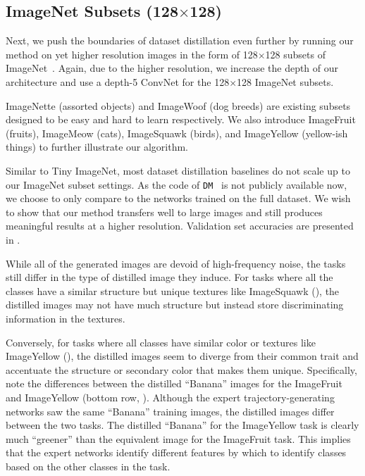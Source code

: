 \documentclass[main.tex]{subfiles}
\begin{document}
\subsection{ImageNet Subsets (128$\times$128)}

Next, we push the boundaries of dataset distillation even further by running our method on yet higher resolution images in the form of 128$\times$128 subsets of ImageNet~\cite{deng2009imagenet}. Again, due to the higher resolution, we increase the depth of our architecture and use a depth-5 ConvNet for the 128$\times$128 ImageNet subsets.


ImageNette (assorted objects) and ImageWoof (dog breeds) are existing subsets~\cite{imagenette} designed to be easy and hard to learn respectively. We also introduce ImageFruit (fruits), ImageMeow (cats), ImageSquawk (birds), and ImageYellow (yellow-ish things) to further illustrate our algorithm. %

Similar to Tiny ImageNet, most dataset distillation baselines do not scale up to our ImageNet subset settings.
As the code of \texttt{DM}~\cite{dm} is not publicly available now, we choose to only compare to the networks trained on the full dataset. We wish to show that our method transfers well to large images and still produces meaningful results at a higher resolution. Validation set accuracies are presented in .

While all of the generated images are devoid of high-frequency noise, the tasks still differ in the type of distilled image they induce. For tasks where all the classes have a similar structure but unique textures like ImageSquawk (), the distilled images may not have much structure but instead store discriminating information in the textures.

Conversely, for tasks where all classes have similar color or textures like ImageYellow (), the distilled images seem to diverge from their common trait and accentuate the structure or secondary color that makes them unique. Specifically, note the differences between the distilled ``Banana'' images for the ImageFruit and ImageYellow (bottom row, ). Although the expert trajectory-generating networks saw the same ``Banana'' training images, the distilled images differ between the two tasks. The distilled ``Banana'' for the ImageYellow task is clearly much ``greener'' than the equivalent image for the ImageFruit task. This implies that the expert networks identify different features by which to identify classes based on the other classes in the task.
\end{document}
